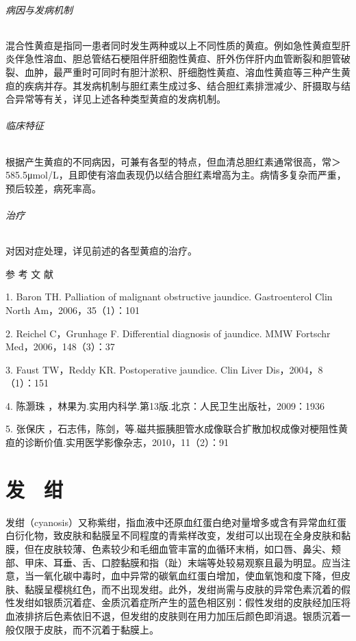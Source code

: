 \subparagraph{病因与发病机制}

混合性黄疸是指同一患者同时发生两种或以上不同性质的黄疸。例如急性黄疸型肝炎伴急性溶血、胆总管结石梗阻伴肝细胞性黄疸、肝外伤伴肝内血管断裂和胆管破裂、血肿，最严重时可同时有胆汁淤积、肝细胞性黄疸、溶血性黄疸等三种产生黄疸的疾病并存。其发病机制与胆红素生成过多、结合胆红素排泄减少、肝摄取与结合异常等有关，详见上述各种类型黄疸的发病机制。

\subparagraph{临床特征}

根据产生黄疸的不同病因，可兼有各型的特点，但血清总胆红素通常很高，常＞
585.5μmol/L，且即使有溶血表现仍以结合胆红素增高为主。病情多复杂而严重，预后较差，病死率高。

\subparagraph{治疗}

对因对症处理，详见前述的各型黄疸的治疗。

\protect\hypertarget{text00040.html}{}{}

\hypertarget{text00040.htmlux5cux23CHP1-16-5}{}
参 考 文 献

1. Baron TH. Palliation of malignant obstructive jaundice. Gastroenterol
Clin North Am，2006，35（1）：101

2. Reichel C，Grunhage F. Differential diagnosis of jaundice. MMW
Fortschr Med，2006，148（3）：37

3. Faust TW，Reddy KR. Postoperative jaundice. Clin Liver
Dis，2004，8（1）：151

4. 陈灏珠 ，林果为.实用内科学.第13版.北京：人民卫生出版社，2009：1936

5. 张保庆
，石志伟，陈剑，等.磁共振胰胆管水成像联合扩散加权成像对梗阻性黄疸的诊断价值.实用医学影像杂志，2010，11（2）：91

\protect\hypertarget{text00041.html}{}{}

\chapter{发　绀}

发绀（cyanosis）又称紫绀，指血液中还原血红蛋白绝对量增多或含有异常血红蛋白衍化物，致皮肤和黏膜呈不同程度的青紫样改变，发绀可以出现在全身皮肤和黏膜，但在皮肤较薄、色素较少和毛细血管丰富的血循环末梢，如口唇、鼻尖、颊部、甲床、耳垂、舌、口腔黏膜和指（趾）末端等处较易观察且最为明显。应当注意，当一氧化碳中毒时，血中异常的碳氧血红蛋白增加，使血氧饱和度下降，但皮肤、黏膜呈樱桃红色，而不出现发绀。此外，发绀尚需与皮肤的异常色素沉着的假性发绀如银质沉着症、金质沉着症所产生的蓝色相区别：假性发绀的皮肤经加压将血液排挤后色素依旧不退，但发绀的皮肤则在用力加压后颜色即消退。银质沉着一般仅限于皮肤，而不沉着于黏膜上。

